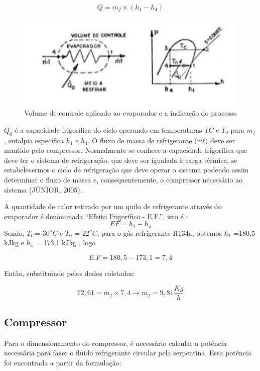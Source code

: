 	\begin{equation}
	Q=m_f \times (h_1-h_4)
	\end{equation}

	\begin{figure}[H]
		\begin{center}
			\includegraphics[scale =1]{figuras/Volume_Evaporador}
			\caption{Volume de controle aplicado ao evaporador e a indicação do processo }
		\end{center}
	\end{figure}
	
	$Q_0$ é a capacidade frigorífica  do ciclo operando em temperaturas $TC$ e $T_0$ para $m_f$, entalpia específica $h_1$ e  $h_4$. O fluxo de massa de refrigerante (mf) deve ser mantido pelo compressor. Normalmente se conhece a capacidade frigorífica que deve ter o sistema de refrigeração, que deve ser igualada à carga térmica, se estabelecermos o ciclo de refrigeração que deve operar o sistema podendo assim determinar o fluxo de massa e, consequentemente, o compressor necessário ao sistema (JÚNIOR, 2005).
	
	 A quantidade de calor retirado por um quilo de refrigerante através do evaporador é denominada “Efeito Frigorífico - E.F.”, isto é :
	 \begin{equation}
	 EF = h_1-h_4
	 \end{equation}
	 Sendo, $T_C$= $30^oC$ e $T_0$ = $22^oC$, para o gás refrigerante R134a, obtemos  $h_1$ =180,5  kJkg  e $h_4$ = 173,1 kJkg  , logo
	 
	 $$
	 E.F = 180,5 - 173,1 = 7,4
	 $$
	 
	 Então, substituindo pelos dados coletados:
	 
	 $$
	72,61 =m_f \times 7,4 \longrightarrow m_f=9,81 \frac{Kg}{h}
	 $$
	 \subsection{Compressor}
	 Para o dimensionamento do compressor, é necessário calcular a potência necessária para fazer o fluido refrigerante circular pela serpentina. Essa potência foi encontrada a partir da formulação: 
	 
